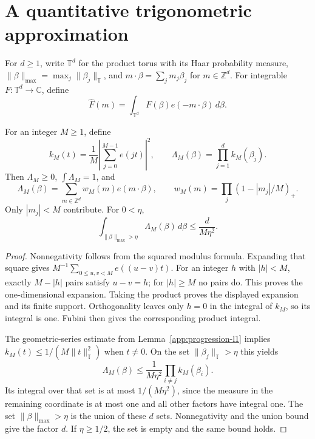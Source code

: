 \section{A quantitative trigonometric approximation}

\begin{definition}
\label{app:torus-fourier}
For $d\geq1$, write $\mathbb T^d$ for the product torus with its Haar
probability measure, $\|\beta\|_{\max}=\max_j\|\beta_j\|_{\mathbb T}$,
and $m\cdot\beta=\sum_jm_j\beta_j$ for $m\in\mathbb Z^d$.
For integrable $F:\mathbb T^d\to\mathbb C$, define
\[
 \widehat F(m)=\int_{\mathbb T^d}F(\beta)e(-m\cdot\beta)\,d\beta.
\]
\end{definition}

\begin{lemma}
\label{app:tensor-fejer}
\leanok
{}
For an integer $M\geq1$, define
\[
 k_M(t)=\frac1M\left|\sum_{j=0}^{M-1} e(jt)\right|^2,
 \qquad \Lambda_M(\beta)=\prod_{j=1}^d k_M(\beta_j).
\]
Then $\Lambda_M\geq0$, $\int\Lambda_M=1$, and
\[
 \Lambda_M(\beta)=\sum_{m\in\mathbb Z^d}
       w_M(m)e(m\cdot\beta),\qquad
 w_M(m)=\prod_j(1-|m_j|/M)_+.
\]
Only $|m_j|<M$ contribute.  For $0<\eta$,
\[
 \int_{\|\beta\|_{\max}>\eta}\Lambda_M(\beta)\,d\beta
 \leq \frac d{M\eta^2}.
\]
\end{lemma}
\begin{proof}
Nonnegativity follows from the squared modulus formula.  Expanding that
square gives $M^{-1}\sum_{0\leq u,v<M}e((u-v)t)$.
For an integer $h$ with $|h|<M$, exactly $M-|h|$ pairs satisfy $u-v=h$;
for $|h|\geq M$ no pairs do.  This proves the one-dimensional expansion.
Taking the product proves the displayed expansion and its finite support.
Orthogonality leaves only $h=0$ in the integral of $k_M$, so its integral
is one.  Fubini then gives the corresponding product integral.

The geometric-series estimate from Lemma~\ref{app:progression-l1} implies
$k_M(t)\leq1/(M\|t\|_{\mathbb T}^2)$ when $t\ne0$.
On the set $\|\beta_j\|_{\mathbb T}>\eta$ this yields
\[
 \Lambda_M(\beta)\leq\frac1{M\eta^2}
                \prod_{i\ne j}k_M(\beta_i).
\]
Its integral over that set is at most $1/(M\eta^2)$, since the measure
in the remaining coordinate is at most one and all other factors have
integral one.  The set $\|\beta\|_{\max}>\eta$ is the union of these $d$
sets.  Nonnegativity and the union bound give the factor $d$.
If $\eta\geq1/2$, the set is empty and the same bound holds.
\end{proof}

